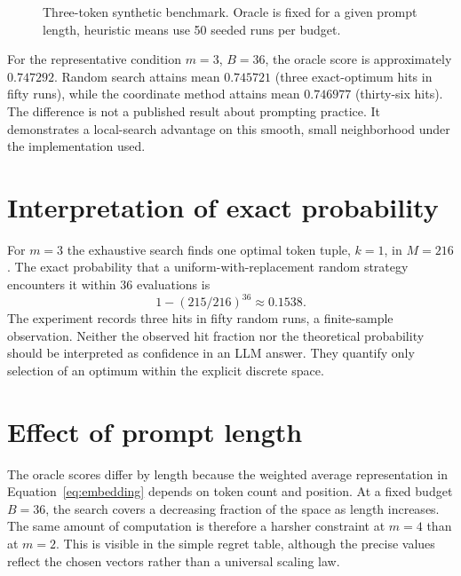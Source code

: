 \documentclass[12pt,a4paper,oneside]{report}
\begin{document}
\begin{figure}[htbp]\centering
{}
\caption{Three-token synthetic benchmark. Oracle is fixed for a given prompt length, heuristic means use 50 seeded runs per budget.}\label{fig:budget}
\end{figure}

For the representative condition $m=3$, $B=36$, the oracle score is approximately $0.747292$. Random search attains mean $0.745721$ (three exact-optimum hits in fifty runs), while the coordinate method attains mean $0.746977$ (thirty-six hits). The difference is not a published result about prompting practice. It demonstrates a local-search advantage on this smooth, small neighborhood under the implementation used.

\section{Interpretation of exact probability}
For $m=3$ the exhaustive search finds one optimal token tuple, $k=1$, in $M=216$. The exact probability that a uniform-with-replacement random strategy encounters it within $36$ evaluations is
\begin{equation}1-(215/216)^{36}\approx 0.1538.\end{equation}
The experiment records three hits in fifty random runs, a finite-sample observation. Neither the observed hit fraction nor the theoretical probability should be interpreted as confidence in an LLM answer. They quantify only selection of an optimum within the explicit discrete space.

\section{Effect of prompt length}
The oracle scores differ by length because the weighted average representation in Equation~\eqref{eq:embedding} depends on token count and position. At a fixed budget $B=36$, the search covers a decreasing fraction of the space as length increases. The same amount of computation is therefore a harsher constraint at $m=4$ than at $m=2$. This is visible in the simple regret table, although the precise values reflect the chosen vectors rather than a universal scaling law.
\end{document}
